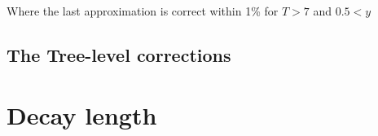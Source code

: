 Where the last approximation is correct within 1\% for $T>7$ and $0.5 < y$



\subsection{The Tree-level corrections}
\label{appA:sec:cross-section-tl}

\section{Decay length}
\label{appA:sec:decay-length}










